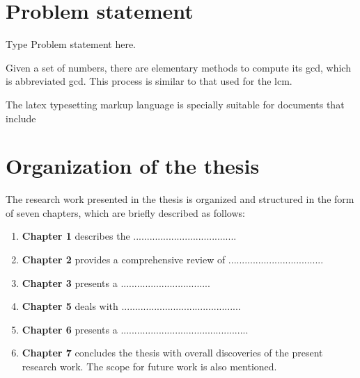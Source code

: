 \section{Problem statement} \label{S1.3}
 Type Problem statement here.

 Given a set of numbers, there are elementary methods to compute 
its \acrlong{gcd}, which is abbreviated \acrshort{gcd}. This process 
is similar to that used for the \acrfull{lcm}.

The \Gls{latex} typesetting markup language is specially suitable 
for documents that include

\clearpage


\section{Organization of the thesis} \label{S1.4}
The research work presented in the thesis is organized and structured in the form of seven chapters, which are briefly described as follows:
\begin{enumerate}[label=\textbf{\roman*)}]
	\item \textbf{Chapter 1} describes the ......................................
	\item \textbf{Chapter 2} provides a comprehensive review of ...................................
	\item \textbf{Chapter 3} presents a .................................
	\item \textbf{Chapter 5} deals with ............................................
	\item \textbf{Chapter 6} presents a ...............................................
	\item \textbf{Chapter 7} concludes the thesis with overall discoveries of the present research work. The scope for future work is also mentioned. 
\end{enumerate} 
